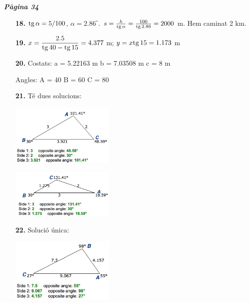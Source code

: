 \documentclass[a4paper, pdf, twoside]{book}
\begin{document}
\begin{multicols}{2}
{\textbf{\em Pàgina 34}} \hrulefill
\begin{enumerate}
\vspace{0.25cm}
\item[\fontfamily{phv}\selectfont\color{blue}\textbf{18. }] 
$\mathrm{tg}\, \alpha = 5/100$, $\alpha = 2.86^\circ $. $s=\frac {h}{\mathrm{tg}\, \alpha } = \frac { 100}{\mathrm{tg}\, 2.86}=2000$ m. Hem caminat 2 km.
 \end{enumerate}
\begin{enumerate}
\vspace{0.25cm}
\item[\fontfamily{phv}\selectfont\color{blue}\textbf{19. }] 
$x=\dfrac {2.5}{\mathrm{tg}\, 40 - \mathrm{tg}\, 15}=4.377$ m; $y=x \mathrm{tg}\, 15 = 1.173$ m
\vspace{0.25cm}
\item[\fontfamily{phv}\selectfont\color{blue}\textbf{20. }] 
Costats: a = 5.22163 m b = 7.03508 m c = 8 m \par Angles: A = 40 B = 60 C = 80
\vspace{0.25cm}
\item[\fontfamily{phv}\selectfont\color{blue}\textbf{21. }] 
Té dues solucions:\par \includegraphics [width=0.4\textwidth ]{img-sol/t3-21a} \par \includegraphics [width=0.4\textwidth ]{img-sol/t3-21b}
\vspace{0.25cm}
\item[\fontfamily{phv}\selectfont\color{blue}\textbf{22. }] 
Solució única:\par \includegraphics [width=0.4\textwidth ]{img-sol/t3-22}
 \end{enumerate}
\vspace{0.3cm}


\end{multicols}
\end{document}
